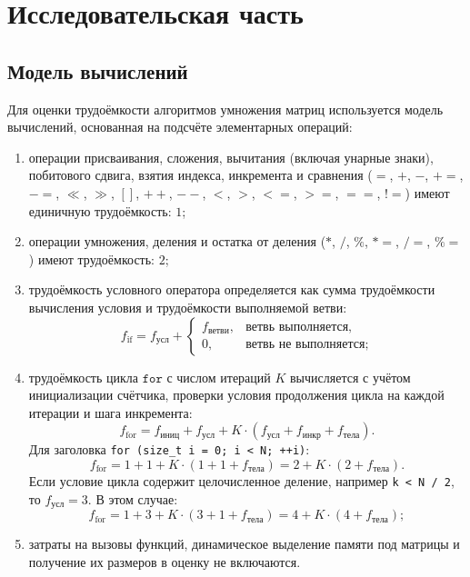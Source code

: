 \chapter{Исследовательская часть}

\section{Модель вычислений}

Для оценки трудоёмкости алгоритмов умножения матриц используется модель вычислений, основанная на подсчёте элементарных операций:
\begin{enumerate}
    \item операции присваивания, сложения, вычитания (включая унарные знаки), побитового сдвига, взятия индекса, инкремента и сравнения ($=$, $+$, $-$, $+=$, $-=$, $\ll$, $\gg$, $[]$, $++$, $--$, $<$, $>$, $<=$, $>=$, $==$, $!=$) имеют единичную трудоёмкость: $1$;
    \item операции умножения, деления и остатка от деления ($*$, $/$, $\%$, $*=$, $/=$, $\%=$) имеют трудоёмкость: $2$;
    \item трудоёмкость условного оператора определяется как сумма трудоёмкости вычисления условия и трудоёмкости выполняемой ветви:
    \begin{equation}
        f_{\text{if}} = f_{\text{усл}} + \begin{cases} 
            f_{\text{ветви}}, & \text{ветвь выполняется}, \\
            0, & \text{ветвь не выполняется};
        \end{cases}
    \end{equation}
    \item трудоёмкость цикла $\texttt{for}$ с числом итераций $K$ вычисляется с учётом инициализации счётчика, проверки условия продолжения цикла на каждой итерации и шага инкремента:
    \begin{equation}
        f_{\text{for}} = f_{\text{иниц}} + f_{\text{усл}} + K \cdot (f_{\text{усл}} + f_{\text{инкр}} + f_{\text{тела}}).
    \end{equation}
    Для заголовка \texttt{for (size\_t i = 0; i < N; ++i)}:
    \begin{equation}
        f_{\text{for}} = 1 + 1 + K \cdot (1 + 1 + f_{\text{тела}}) = 2 + K \cdot (2 + f_{\text{тела}}).
    \end{equation}
    Если условие цикла содержит целочисленное деление, например \texttt{k < N / 2}, то $f_{\text{усл}} = 3$. В этом случае:
    \begin{equation}
        f_{\text{for}} = 1 + 3 + K \cdot (3 + 1 + f_{\text{тела}}) = 4 + K \cdot (4 + f_{\text{тела}});
    \end{equation}
    \item затраты на вызовы функций, динамическое выделение памяти под матрицы и получение их размеров в оценку не включаются.
\end{enumerate}

